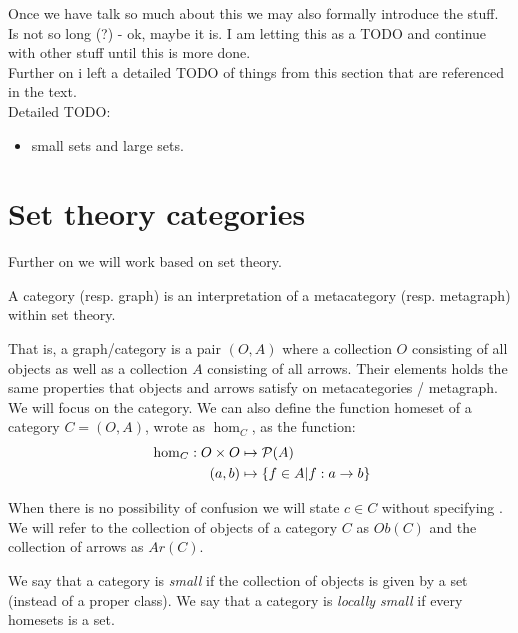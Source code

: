 Once we have talk so much about this we may also formally introduce the stuff. Is not so long (?)  - ok, maybe it is. I am letting this as a TODO and continue with other stuff until this is more done.\\

Further on i left a detailed TODO of things from this section that are referenced in the text.\\

Detailed TODO:
\begin{itemize}
\item small sets and large sets.
\end{itemize}


\section{Set theory categories}
Further on we will work based on set theory.

\begin{definition}
  A category (resp. graph) is an interpretation of a metacategory (resp. metagraph) within set theory.
\end{definition}


That is, a graph/category is a pair $(O,A)$ where a collection $O$ consisting of all objects as well as a collection $A$ consisting of all arrows. Their elements holds the same properties that objects and arrows satisfy on metacategories / metagraph.\\


We will focus on the category. We can also define the function homeset of a category $C=(O,A)$, wrote as $\hom_{C}$, as the function:
\begin{align*}
  && \hom_{C}: O \times O &\mapsto \mathcal{P}(A)&\\
  \displaystyle &\ &(a,b)&\mapsto \{f\in A | f:a\to b\}&
\end{align*}

When there is no possibility of confusion we will state $c\in C$ without specifying . We will refer to the collection of objects of a category $C$ as $Ob(C)$ and the collection of arrows as $Ar(C)$. 

\begin{definition}
  We say that a category is \emph{small} if the collection of objects is given by a set (instead of a proper class). We say that a category is \emph{locally small} if every homesets is a set.
\end{definition}

